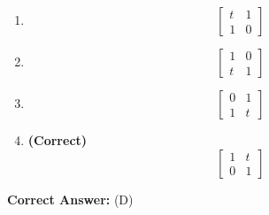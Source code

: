 \documentclass[11pt,a4paper]{article}
\begin{document}
\begin{enumerate}[label=(\Alph*)]
    \item \[
\begin{bmatrix} t & 1\\ 1&0 \end{bmatrix}
\]
    \item \[
\begin{bmatrix} 1 & 0\\ t&1 \end{bmatrix}
\]
    \item \[
\begin{bmatrix} 0 & 1\\ 1&t \end{bmatrix}
\]
    \item \textbf{(Correct)} \[
\begin{bmatrix} 1 & t\\ 0&1 \end{bmatrix}
\]
\end{enumerate}

\noindent \textbf{Correct Answer:} (D)
\end{document}
